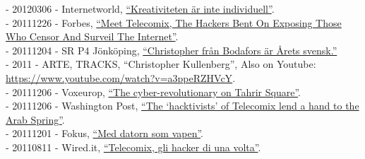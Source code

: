 \documentclass[a4paper,11pt,oneside]{article}
\begin{document}
    - 20120306 - Internetworld, \href{http://www.idg.se/2.1085/1.435933/kreativiteten-ar-inte-individuell}{``Kreativiteten är inte individuell''}. \\
    - 20111226 - Forbes, \href{http://www.forbes.com/sites/andygreenberg/2011/12/26/meet-telecomix-the-hackers-bent-on-exposing-those-who-censor-and-surveil-the-internet/}{``Meet Telecomix, The Hackers Bent On Exposing Those Who Censor And Surveil The Internet''}. \\
    - 20111204 - SR P4 Jönköping, \href{http://t.sr.se/1gy095E}{``Christopher från Bodafors är Årets svensk.''} \\
    - 2011 - ARTE, TRACKS, ``Christopher Kullenberg'', Also on Youtube: \href{https://www.youtube.com/watch?v=a3ppeRZHVcY}{https://www.youtube.com/watch?v=a3ppeRZHVcY}.\\
    - 20111206 - Voxeurop, \href{http://www.voxeurop.eu/en/content/article/1254651-cyber-revolutionary-tahrir-square}{``The cyber-revolutionary on Tahrir Square''}. \\
    - 20111206 - Washington Post, \href{https://www.washingtonpost.com/lifestyle/style/the-hacktivists-of-telecomix-lend-a-hand-to-the-arab-spring/2011/12/05/gIQAAosraO_story.html}{``The ‘hacktivists’ of Telecomix lend a hand to the Arab Spring''}. \\
    - 20111201 - Fokus, \href{http://www.fokus.se/2011/12/med-datorn-som-vapen/}{``Med datorn som vapen''}. \\
    - 20110811 - Wired.it, \href{http://daily.wired.it/news/internet/2011/08/11/telecomix-hacker-egitto-tunisia-iran-13861.html}{``Telecomix, gli hacker di una volta''}. \\
\end{document}
